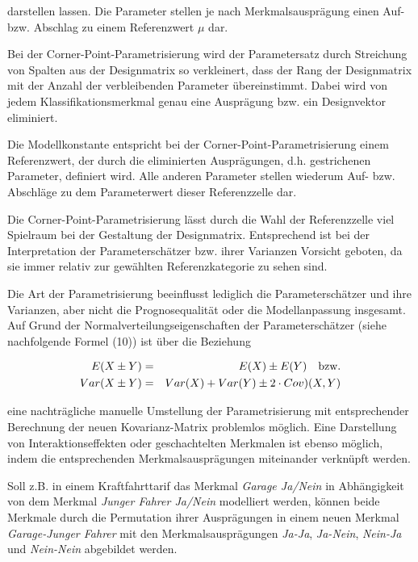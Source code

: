  darstellen lassen. Die Parameter stellen je nach Merkmalsausprägung einen Auf- bzw. Abschlag zu einem Referenzwert $\mu$  dar.

Bei der Corner-Point-Parametrisierung wird der Parametersatz durch Streichung von Spalten aus der Designmatrix so verkleinert, dass der Rang der Designmatrix mit der Anzahl der verbleibenden Parameter übereinstimmt. Dabei wird von jedem Klassifikationsmerkmal genau eine Ausprägung bzw. ein Designvektor eliminiert.

Die Modellkonstante entspricht bei der Corner-Point-Parametrisierung einem Referenzwert, der durch die eliminierten Ausprägungen, d.h. gestrichenen Parameter, definiert wird. Alle anderen Parameter stellen wiederum Auf- bzw. Abschläge zu dem Parameterwert dieser Referenzzelle dar.

Die Corner-Point-Parametrisierung lässt durch die Wahl der Referenzzelle viel Spielraum bei der Gestaltung der Designmatrix. Entsprechend ist bei der Interpretation der Parameterschätzer bzw. ihrer Varianzen Vorsicht geboten, da sie immer relativ zur gewählten Referenzkategorie zu sehen sind.

Die Art der Parametrisierung beeinflusst lediglich die Parameterschätzer und ihre Varianzen, aber nicht die Prognosequalität oder die Modellanpassung insgesamt. Auf Grund der Normalverteilungseigenschaften der Parameterschätzer (siehe nachfolgende Formel (10)) ist über die Beziehung

\begin{eqnarray}  
E(X \pm Y) &=& E(X) \pm E(Y)  \quad  \textnormal{bzw.} \nonumber \\  
Var(X \pm Y) &=& Var(X) + Var(Y) \pm 2 \cdot Cov)(X,Y)
\end{eqnarray}
 
eine nachträgliche manuelle Umstellung der Parametrisierung mit entsprechender Berechnung der neuen Kovarianz-Matrix problemlos möglich. Eine Darstellung von Interaktionseffekten oder geschachtelten Merkmalen ist ebenso möglich, indem die entsprechenden Merkmalsausprägungen miteinander verknüpft werden. 

Soll z.B. in einem Kraftfahrttarif das Merkmal \textit{Garage Ja/Nein} in Abhängigkeit von dem Merkmal \textit{Junger Fahrer Ja/Nein} modelliert werden, können beide Merkmale durch die Permutation ihrer Ausprägungen in einem neuen Merkmal \textit{Garage-Junger Fahrer} mit den Merkmalsausprägungen \textit{Ja-Ja}, \textit{Ja-Nein}, \textit{Nein-Ja} und \textit{Nein-Nein} abgebildet werden.

